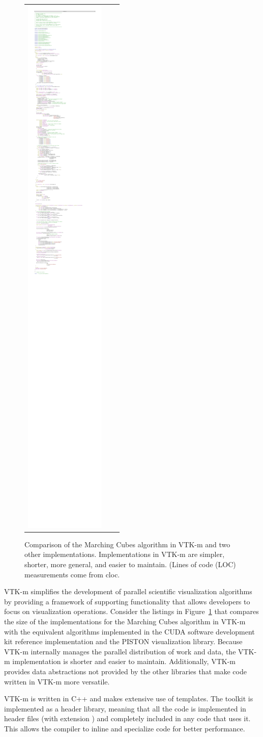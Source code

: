 \begin{figure}[htb]
\begin{tabular}{ccc}
    \includegraphics[width=.75in]{images/MCCompareVTKm}
  \end{tabular}
  \caption[Comparison of Marching Cubes implementations.]{Comparison of the
    Marching Cubes algorithm in VTK-m and two other implementations.
    Implementations in VTK-m are simpler, shorter, more general, and easier
    to maintain. (Lines of code (LOC) measurements come from cloc.}
  \label{fig:MCCompare}
\end{figure}

VTK-m simplifies the development of parallel scientific visualization
algorithms by providing a framework of supporting functionality that allows
developers to focus on visualization operations. Consider the listings in
Figure~\ref{fig:MCCompare} that compares the size of the implementations
for the Marching Cubes algorithm in VTK-m with the equivalent algorithms
implemented in the CUDA software development kit reference implementation
and the PISTON visualization library. Because VTK-m internally manages the
parallel distribution of work and data, the VTK-m implementation is shorter
and easier to maintain. Additionally, VTK-m provides data abstractions not
provided by the other libraries that make code written in VTK-m more
versatile.

\begin{didyouknow}
  VTK-m is written in C++ and makes extensive use of templates. The toolkit
  is implemented as a header library, meaning that all the code is
  implemented in header files (with extension ) and
  completely included in any code that uses it. This allows the compiler to
  inline and specialize code for better performance.
\end{didyouknow}

